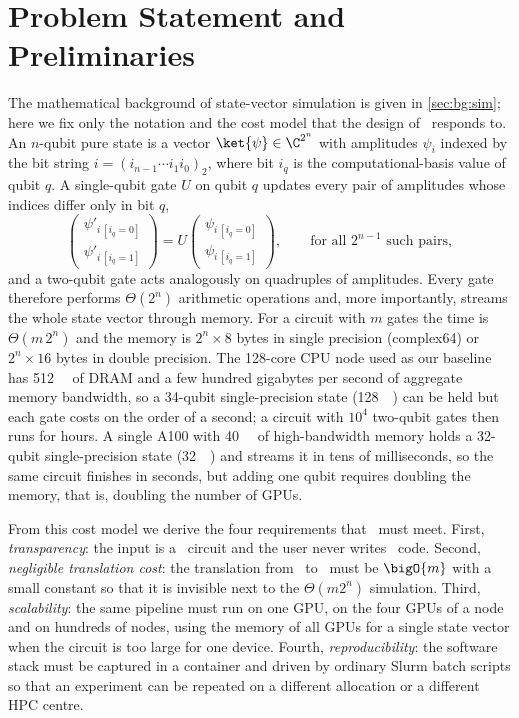 \section{Problem Statement and Preliminaries}\label{sec:qgear:problem}

The mathematical background of state-vector simulation is given in \cref{sec:bg:sim}; here we fix only the notation and the cost model that the design of \qgear\ responds to. An $n$-qubit pure state is a vector $\ket{\psi}\in\C^{2^{n}}$ with amplitudes $\psi_{i}$ indexed by the bit string $i=(i_{n-1}\cdots i_{1}i_{0})_{2}$, where bit $i_{q}$ is the computational-basis value of qubit $q$. A single-qubit gate $U$ on qubit $q$ updates every pair of amplitudes whose indices differ only in bit $q$,
\begin{equation}\label{eq:qgear:sqgate}
  \begin{pmatrix}\psi'_{i\,[i_{q}=0]}\\ \psi'_{i\,[i_{q}=1]}\end{pmatrix}
  = U \begin{pmatrix}\psi_{i\,[i_{q}=0]}\\ \psi_{i\,[i_{q}=1]}\end{pmatrix},
  \qquad \text{for all } 2^{n-1} \text{ such pairs},
\end{equation}
and a two-qubit gate acts analogously on quadruples of amplitudes. Every gate therefore performs $\Theta(2^{n})$ arithmetic operations and, more importantly, streams the whole state vector through memory. For a circuit with $m$ gates the time is $\Theta(m\,2^{n})$ and the memory is $2^{n}\times 8$ bytes in single precision (complex64) or $2^{n}\times 16$ bytes in double precision. The 128-core CPU node used as our baseline has \SI{512}{\giga\byte} of DRAM and a few hundred gigabytes per second of aggregate memory bandwidth, so a 34-qubit single-precision state (\SI{128}{\giga\byte}) can be held but each gate costs on the order of a second; a circuit with $10^{4}$ two-qubit gates then runs for hours. A single A100 with \SI{40}{\giga\byte} of high-bandwidth memory holds a 32-qubit single-precision state (\SI{32}{\giga\byte}) and streams it in tens of milliseconds, so the same circuit finishes in seconds, but adding one qubit requires doubling the memory, that is, doubling the number of GPUs.

From this cost model we derive the four requirements that \qgear\ must meet. First, \emph{transparency}: the input is a \qiskit\ circuit and the user never writes \cudaq\ code. Second, \emph{negligible translation cost}: the translation from \qiskit\ to \cudaq\ must be $\bigO{m}$ with a small constant so that it is invisible next to the $\Theta(m 2^{n})$ simulation. Third, \emph{scalability}: the same pipeline must run on one GPU, on the four GPUs of a node and on hundreds of nodes, using the memory of all GPUs for a single state vector when the circuit is too large for one device. Fourth, \emph{reproducibility}: the software stack must be captured in a container and driven by ordinary Slurm batch scripts so that an experiment can be repeated on a different allocation or a different HPC centre.

